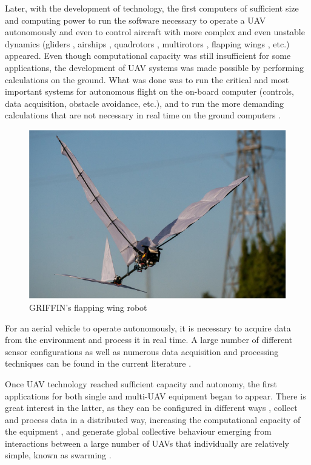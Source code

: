 Later, with the development of technology, the first computers of sufficient size and computing power to run the software necessary to operate a \gls{UAV} autonomously and even to control aircraft with more complex and even unstable dynamics (gliders \cite{predator, BIGBLUE}, airships \cite{AURORA}, quadrotors \cite{quadrotorsreview, mesicopter, pounds, miniquadrotor}, multirotors \cite{fullyactuated}, flapping wings \cite{COLIBRI, GRIFFING, GRIFFIN2021}, etc.) appeared. Even though computational capacity was still insufficient for some applications, the development of \gls{UAV} systems was made possible by performing calculations on the ground. What was done was to run the critical and most important systems for autonomous flight on the on-board computer (controls, data acquisition, obstacle avoidance, etc.), and to run the more demanding calculations that are not necessary in real time on the ground computers \cite{OffBoard}.

\begin{figure}[htbp]
    \centering
    \includegraphics[width=0.6\linewidth]
    {Preliminaries/figures/GRIFFIN.png}
    \caption{GRIFFIN's flapping wing robot \cite{GRIFFIN2021}}
    \label{fig:predator}
\end{figure}

For an aerial vehicle to operate autonomously, it is necessary to acquire data from the environment and process it in real time. A large number of different sensor configurations as well as numerous data acquisition and processing techniques can be found in the current literature \cite{SenseAndAvoid, aasen2018quantitative, miningSensors}.

Once UAV technology reached sufficient capacity and autonomy, the first applications for both single \cite{nex2014uav, radoglou2020compilation, drummond2015uav} and multi-\gls{UAV} \cite{martinez2007multi, gu2018multiple, scherer2015autonomous} equipment began to appear. There is great interest in the latter, as they can be configured in different ways \cite{multiUAVclassification}, collect and process data in a distributed way, increasing the computational capacity of the equipment \cite{pascarella2015parallel, guo2021coded}, and generate global collective behaviour emerging from interactions between a large number of \glspl{UAV} that individually are relatively simple, known as swarming \cite{zhou2020uav, campion2018uav, chen2020sidr}. 

